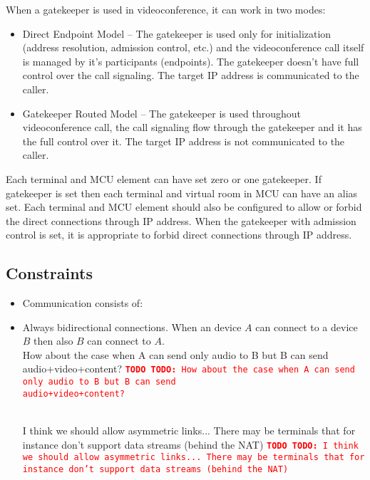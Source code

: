 \documentclass[a4paper]{report}
\newcommand{\TODO}[1]{%
\def\empty{}%
\def\prvniparametr{#1}%
\ifx\prvniparametr\empty%
\begingroup\tt\textcolor{red}{\noindent\textbf{TODO}}\endgroup
\else%
\begingroup\tt\textcolor{red}{\noindent\textbf{TODO:}\ #1}\endgroup
\fi%
}
\begin{document}
When a gatekeeper is used in videoconference, it can work in two modes:
\begin{itemize}
\item Direct Endpoint Model -- The gatekeeper is used only for initialization (address resolution, admission control, etc.) and the videoconference call itself is managed by it's participants (endpoints). The gatekeeper doesn't have full control over the call signaling. The target IP address is communicated to the caller.
\item Gatekeeper Routed Model -- The gatekeeper is used throughout videoconference call, the call signaling flow through the gatekeeper and it has the full control over it. The target IP address is not communicated to the caller.
\end{itemize}

Each terminal and MCU element can have set zero or one gatekeeper. If gatekeeper is set then each terminal and virtual room in MCU can have an alias set. Each terminal and MCU element should also be configured to allow or forbid the direct connections through IP address. When the gatekeeper with admission control is set, it is appropriate to forbid direct connections through IP address.


\subsection{Constraints}

\begin{itemize}

\item Communication consists of:

\item Always bidirectional connections. When an device $A$ can connect to a device $B$ then also $B$ can connect to $A$.
\\ \TODO{How about the case when A can send only audio to B but B can send \\ audio+video+content?}
\\ \TODO{I think we should allow asymmetric links... There may be terminals that for instance don't support data streams (behind the NAT)}

\end{itemize}
\end{document}
